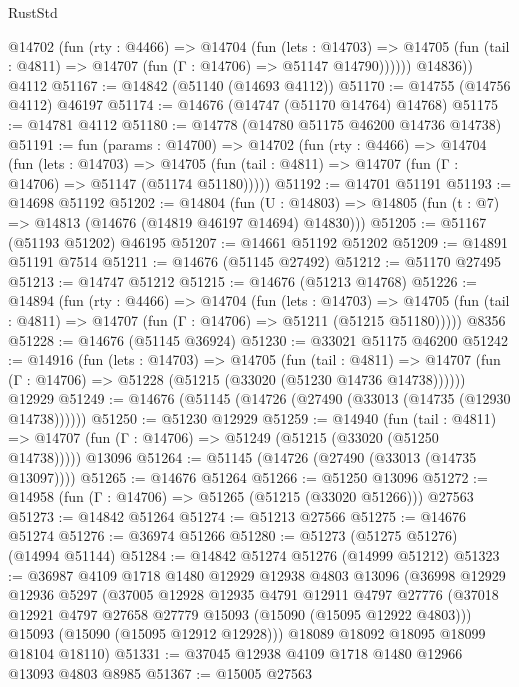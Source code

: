 \begin{lexlean}{RustStd}
\begin{coremodule}
          @14702
            (fun (rty : @4466) =>
            @14704
              (fun (lets : @14703) =>
              @14705 (fun (tail : @4811) => @14707 (fun (Γ : @14706) => @51147 @14790))))))
        @14836))
    @4112
@51167 := @14842 (@51140 (@14693 @4112))
@51170 := @14755 (@14756 @4112) @46197
@51174 := @14676 (@14747 (@51170 @14764) @14768)
@51175 := @14781 @4112
@51180 := @14778 (@14780 @51175 @46200 @14736 @14738)
@51191 := fun (params : @14700) =>
  @14702
    (fun (rty : @4466) =>
    @14704
      (fun (lets : @14703) =>
      @14705 (fun (tail : @4811) => @14707 (fun (Γ : @14706) => @51147 (@51174 @51180)))))
@51192 := @14701 @51191
@51193 := @14698 @51192
@51202 := @14804
    (fun (U : @14803) => @14805 (fun (t : @7) => @14813 (@14676 (@14819 @46197 @14694) @14830)))
@51205 := @51167 (@51193 @51202) @46195
@51207 := @14661 @51192 @51202
@51209 := @14891 @51191 @7514
@51211 := @14676 (@51145 @27492)
@51212 := @51170 @27495
@51213 := @14747 @51212
@51215 := @14676 (@51213 @14768)
@51226 := @14894
    (fun (rty : @4466) =>
    @14704
      (fun (lets : @14703) =>
      @14705 (fun (tail : @4811) => @14707 (fun (Γ : @14706) => @51211 (@51215 @51180)))))
    @8356
@51228 := @14676 (@51145 @36924)
@51230 := @33021 @51175 @46200
@51242 := @14916
    (fun (lets : @14703) =>
    @14705
      (fun (tail : @4811) =>
      @14707 (fun (Γ : @14706) => @51228 (@51215 (@33020 (@51230 @14736 @14738))))))
    @12929
@51249 := @14676 (@51145 (@14726 (@27490 (@33013 (@14735 (@12930 @14738))))))
@51250 := @51230 @12929
@51259 := @14940
    (fun (tail : @4811) => @14707 (fun (Γ : @14706) => @51249 (@51215 (@33020 (@51250 @14738)))))
    @13096
@51264 := @51145 (@14726 (@27490 (@33013 (@14735 @13097))))
@51265 := @14676 @51264
@51266 := @51250 @13096
@51272 := @14958 (fun (Γ : @14706) => @51265 (@51215 (@33020 @51266))) @27563
@51273 := @14842 @51264
@51274 := @51213 @27566
@51275 := @14676 @51274
@51276 := @36974 @51266
@51280 := @51273 (@51275 @51276) (@14994 @51144)
@51284 := @14842 @51274 @51276 (@14999 @51212)
@51323 := @36987
    @4109
    @1718
    @1480
    @12929
    @12938
    @4803
    @13096
    (@36998
      @12929
      @12936
      @5297
      (@37005
        @12928
        @12935
        @4791
        @12911
        @4797
        @27776
        (@37018 @12921 @4797 @27658 @27779 @15093 (@15090 (@15095 @12922 @4803)))
        @15093
        (@15090 (@15095 @12912 @12928)))
      @18089
      @18092
      @18095
      @18099
      @18104
      @18110)
@51331 := @37045 @12938 @4109 @1718 @1480 @12966 @13093 @4803 @8985
@51367 := @15005
    @27563

\end{coremodule}
\end{lexlean}
